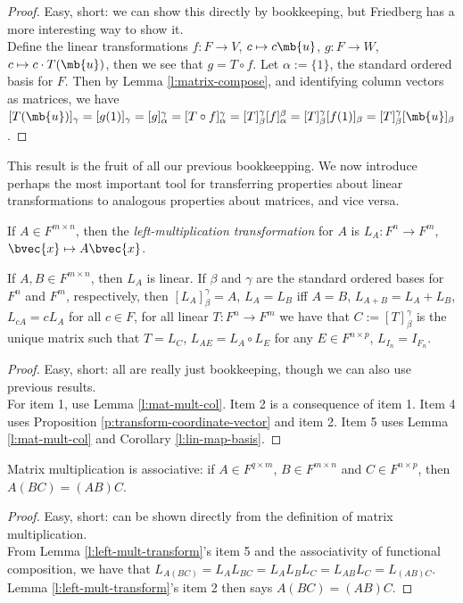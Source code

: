 \begin{proof}
Easy, short: we can show this directly by bookkeeping, but Friedberg has a more interesting way to show it.\\
Define the linear transformations $f:F \to V$, $c \mapsto c \mb{u}$, $g:F \to W$, $c \mapsto c \cdot T( \mb{u})$, then we see that $g=T \circ f$. Let $\alpha:= \{ 1 \}$, the standard ordered basis for $F$.
Then by Lemma \ref{l:matrix-compose}, and identifying column vectors as matrices, we have $[T( \mb{u})]_\gamma =[g(1)]_\gamma =[g]_\alpha^\gamma =[T \circ f]_\alpha^\gamma =[T]_\beta^\gamma [f]_\alpha^\beta =[T]_\beta^\gamma [f(1)]_\beta =[T]_\beta^\gamma [ \mb{u}]_\beta$.
\end{proof}
This result is the fruit of all our previous bookkeepping. We now introduce perhaps the most important tool for transferring properties about linear transformations to analogous properties about matrices, and vice versa.
\begin{defn}
If $A \in F^{m \times n}$, then the \emph{left-multiplication transformation} for $A$ is $L_A:F^n \to F^m$, $\bvec{x}\mapsto A \bvec{x}$.
\end{defn}
\begin{lem}\label{l:left-mult-transform}
If $A,B \in F^{m \times n}$, then $L_A$ is linear. If $\beta$ and $\gamma$ are the standard ordered bases for $F^n$ and $F^m$, respectively, then $[L_A]_\beta^\gamma =A$, $L_A=L_B$ iff $A=B$, $L_{A+B}=L_A+L_B$, $L_{cA}=cL_A$ for all $c \in F$, for all linear $T:F^n \to F^m$ we have that $C:=[T]_\beta^\gamma$ is the unique matrix such that $T=L_C$, $L_{AE}=L_A \circ L_E$ for any $E \in F^{n \times p}$, $L_{I_n}=I_{F_n}$. 
\end{lem}
\begin{proof}
Easy, short: all are really just bookkeeping, though we can also use previous results.\\
For item 1, use Lemma \ref{l:mat-mult-col}. Item 2 is a consequence of item 1. Item 4 uses Proposition \ref{p:transform-coordinate-vector} and item 2. Item 5 uses Lemma \ref{l:mat-mult-col} and Corollary \ref{l:lin-map-basis}.
\end{proof}
\begin{lem}\label{l:mat-mult-assoc}
Matrix multiplication is associative: if $A \in F^{q \times m}$, $B \in F^{m \times n}$ and $C \in F^{n \times p}$, then $A(BC)=(AB)C$.
\end{lem}
\begin{proof}
Easy, short: can be shown directly from the definition of matrix multiplication.\\
From Lemma \ref{l:left-mult-transform}'s item 5 and the associativity of functional composition, we have that $L_{A(BC)}=L_AL_{BC}=L_AL_BL_C=L_{AB}L_C=L_{(AB)C}$. Lemma \ref{l:left-mult-transform}'s item 2 then says $A(BC)=(AB)C$.
\end{proof}
